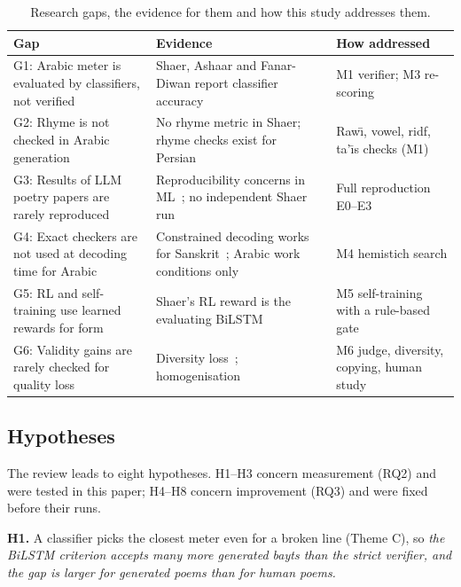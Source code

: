 \begin{table}[t]
\centering
\caption{Research gaps, the evidence for them and how this study addresses them.}
\label{tab:gaps}
\footnotesize
\begin{tabularx}{\columnwidth}{@{}>{\raggedright\arraybackslash}p{1.9cm} >{\raggedright\arraybackslash}X >{\raggedright\arraybackslash}p{2.0cm}@{}}
\toprule
Gap & Evidence & How addressed \\
\midrule
G1: Arabic meter is evaluated by classifiers, not verified & Shaer, Ashaar and Fanar-Diwan report classifier accuracy~\cite{abbas2026shaer,abandah2022classifying,mutawa2025arabicmeter} & M1 verifier; M3 re-scoring \\
G2: Rhyme is not checked in Arabic generation & No rhyme metric in Shaer; rhyme checks exist for Persian~\cite{rezaei2026chaame} & Raw\={\i}, vowel, ridf, ta'\={\i}s checks (M1) \\
G3: Results of LLM poetry papers are rarely reproduced & Reproducibility concerns in ML~\cite{pineau2021reproducibility}; no independent Shaer run & Full reproduction E0--E3 \\
G4: Exact checkers are not used at decoding time for Arabic & Constrained decoding works for Sanskrit~\cite{jagadeeshan2026chandomitra}; Arabic work conditions only & M4 hemistich search \\
G5: RL and self-training use learned rewards for form & Shaer's RL reward is the evaluating BiLSTM & M5 self-training with a rule-based gate \\
G6: Validity gains are rarely checked for quality loss & Diversity loss~\cite{chen2024diversity}; homogenisation~\cite{zhang2026multiagent} & M6 judge, diversity, copying, human study \\
\bottomrule
\end{tabularx}
\end{table}

\subsection{Hypotheses}
\label{sec:hyp}
The review leads to eight hypotheses. H1--H3 concern measurement (RQ2) and were tested in this paper; H4--H8 concern
improvement (RQ3) and were fixed before their runs.

\textbf{H1.} A classifier picks the closest meter even for a broken line (Theme C), so \emph{the BiLSTM criterion
accepts many more generated bayts than the strict verifier, and the gap is larger for generated poems than for human
poems.}

